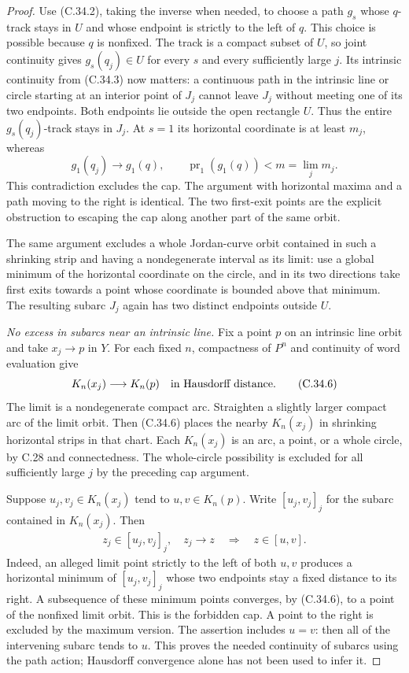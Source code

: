 \begin{proof}
Use (C.34.2), taking the inverse when needed, to choose
a path $g_s$ whose $q$-track stays in $U$ and whose
endpoint is strictly to the left of $q$. This choice
is possible because $q$ is nonfixed. The track is a
compact subset of $U$, so joint continuity gives
$g_s(q_j)\in U$ for every $s$ and every sufficiently
large $j$.
Its intrinsic continuity from (C.34.3) now matters:
a continuous path in the intrinsic line or circle
starting at an interior point of $J_j$ cannot leave
$J_j$ without meeting one of its two endpoints.
Both endpoints lie outside the open rectangle $U$.
Thus the entire $g_s(q_j)$-track stays in $J_j$.
At $s=1$ its horizontal coordinate is at least $m_j$,
whereas
\[
        g_1(q_j)\longrightarrow g_1(q),\qquad
        \operatorname{pr}_1(g_1(q))<m=\lim_jm_j.
                                                        \tag{C.34.5}
\]
This contradiction excludes the cap.
The argument with horizontal maxima and a path moving
to the right is identical. The two first-exit points
are the explicit obstruction to escaping the cap
along another part of the same orbit.

The same argument excludes a whole Jordan-curve orbit
contained in such a shrinking strip and having a
nondegenerate interval as its limit: use a global
minimum of the horizontal coordinate on the circle,
and in its two directions take first exits towards
a point whose coordinate is bounded above that
minimum. The resulting subarc $J_j$ again has
two distinct endpoints outside $U$.

\emph{No excess in subarcs near an intrinsic line.}
Fix a point $p$ on an intrinsic line orbit and
take $x_j\to p$ in $Y$. For each fixed $n$, compactness
of $P^n$ and continuity of word evaluation give
\[
                         K_n(x_j)\longrightarrow K_n(p)
              \quad\hbox{in Hausdorff distance}.         \tag{C.34.6}
\]
The limit is a nondegenerate compact arc. Straighten
a slightly larger compact arc of the limit orbit.
Then (C.34.6) places the nearby $K_n(x_j)$ in shrinking
horizontal strips in that chart. Each $K_n(x_j)$ is
an arc, a point, or a whole circle, by C.28 and
connectedness. The whole-circle possibility is
excluded for all sufficiently large $j$ by the
preceding cap argument.

Suppose $u_j,v_j\in K_n(x_j)$ tend to $u,v\in K_n(p)$.
Write $[u_j,v_j]_j$ for the subarc contained in
$K_n(x_j)$. Then
\[
 \begin{gathered}
 z_j\in[u_j,v_j]_j,\quad z_j\longrightarrow z
             \quad\Longrightarrow\quad z\in[u,v].
                                                        \tag{C.34.7}
 \end{gathered}
\]
Indeed, an alleged limit point strictly to the left
of both $u,v$ produces a horizontal minimum of
$[u_j,v_j]_j$ whose two endpoints stay a fixed
distance to its right. A subsequence of these
minimum points converges, by (C.34.6), to a point
of the nonfixed limit orbit. This is the forbidden
cap. A point to the right is excluded by the
maximum version. The assertion includes $u=v$:
then all of the intervening subarc tends to $u$.
This proves the needed continuity of subarcs using
the path action; Hausdorff convergence alone has
not been used to infer it.


\end{proof}
